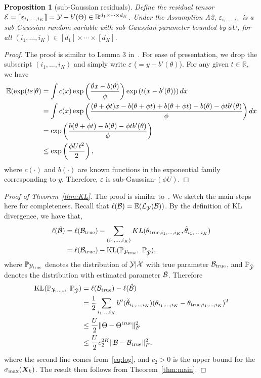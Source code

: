 \documentclass[12pt]{article}
\theoremstyle{plain}
\newtheorem{prop}{Proposition}
\theoremstyle{definition}
\begin{document}
\begin{prop}[sub-Gaussian residuals]\label{prop}
Define the residual tensor $\mathcal{E}=\llbracket \varepsilon_{i_1,\ldots,i_K} \rrbracket=\mathcal{Y}-b'(\Theta)\in\mathbb{R}^{d_1\times \cdots \times d_K}$. Under the Assumption A2, $\varepsilon_{i_1,\ldots,i_K}$ is a sub-Gaussian random variable with sub-Gaussian parameter bounded by $\phi U$, for all $(i_1,\ldots,i_K)\in[d_1]\times\cdots\times[d_K]$.
\end{prop}
\begin{proof} The proof is similar to Lemma 3 in~\citep{fan2019generalized}. For ease of presentation, we drop the subscript $(i_1,\ldots,i_K)$ and simply write $\varepsilon$ ($=y-b'(\theta)$). For any given $t\in\mathbb{R}$, we have
\begin{align}
\mathbb{E}(\exp(t\varepsilon|\theta)&=\int c(x) \exp\left({\theta x - b(\theta)\over \phi}   \right)\exp \left(t(x-b'(\theta))\right)dx\\
&=\int c(x)\exp \left( {(\theta + \phi t)x - b (\theta+\phi t)+b(\theta+\phi t)-b(\theta)-\phi t b'(\theta) \over \phi}\right)dx\\
&=\exp\left( {b(\theta+\phi t)-b(\theta)-\phi t b'(\theta) \over \phi} \right)\\
&\leq \exp\left(\phi U t^2\over 2 \right),
\end{align}
where $c(\cdot)$ and $b(\cdot)$ are known functions in the exponential family corresponding to $y$. 
Therefore, $\varepsilon$ is sub-Gaussian-$(\phi U)$. 
\end{proof}

\begin{proof}[Proof of Theorem~\ref{thm:KL}]
The proof is similar to~\citep{baldin2018optimal}. We sketch the main steps here for completeness. Recall that $\ell(\mathcal{B})=\mathbb{E}(\mathcal{L}_{\mathcal{Y}}(\mathcal{B}))$. By the definition of KL divergence, we have that,
\begin{align}
\ell(\hat \tB)&=\ell(\trueB)-\sum_{(i_1,\ldots,i_K)} KL(\theta_{\text{true}, i_1,\ldots, i_K}, \hat \theta_{i_1,\ldots,i_K})\\
&=\ell(\trueB)-\text{KL}(\mathbb{P}_{\tY_{\text{true}}},\ \mathbb{P}_{\hat \tY}),
\end{align}
where $\mathbb{P}_{\mathcal{Y}_{\text{true}}}$ denotes the distribution of $\mathcal{Y}|\mathcal{X}$ with true parameter $\mathcal{B}_{\text{true}}$, and $\mathbb{P}_{\hat {\mathcal{Y}}}$ denotes the distribution with estimated parameter $\hat {\mathcal{B}}$. Therefore
\begin{align}
\text{KL}(\mathbb{P}_{\mathcal{Y}_{\text{true}}},\ \mathbb{P}_{\hat {\mathcal{Y}}}) &= \ell(\mathcal{B}_{\text{true}})-\ell(\hat {\mathcal{B}})\\
&={1\over 2}\sum_{i_1\ldots,i_K}b''(\check \theta_{i_1,\ldots,i_K})(\theta_{i_1,\ldots,i_K}-\theta_{\text{true},i_1,\ldots,i_K})^2\\
&\leq {U\over 2} \lVert\Theta-\Theta^{\text{true}}\rVert_F^2\\
&\leq {U \over 2}c^{2K}_2\lVert\mathcal{B}-\mathcal{B}_{\text{true}}\rVert_F^2,
\end{align}
where the second line comes from~\eqref{eq:log}, and $c_2>0$ is the upper bound for the $\sigma_{\max}(\bm X_k)$. The result then follows from Theorem~\ref{thm:main}.
\end{proof}
\end{document}
